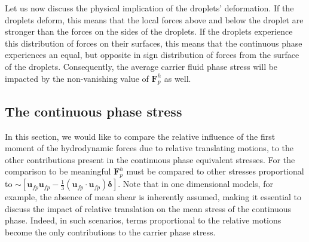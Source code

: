 Let us now discuss the physical implication of the droplets' deformation. 
If the droplets deform, this means that the local forces above and below the droplet are stronger than the forces on the sides of the droplets. 
If the droplets experience this distribution of forces on their surfaces, this means that the continuous phase experiences an equal, but opposite in sign distribution of forces from the surface of the droplets. 
Consequently, the average carrier fluid phase stress will be impacted by the non-vanishing value of $\textbf{F}^h_p$ as well. 

\subsection{The continuous phase stress}

In this section, we would like to compare the relative influence of the first moment of the hydrodynamic forces due to relative translating motions, to the other contributions present in the continuous phase equivalent stresses. 
For the comparison to be meaningful $\textbf{F}^h_p$ must be compared to other stresses proportional to $\sim [\textbf{u}_{fp}\textbf{u}_{fp}-\frac{1}{3}(\textbf{u}_{fp}\cdot\textbf{u}_{fp})\bm\delta]$. 
Note that in one dimensional models, for example, the absence of mean shear is inherently assumed, making it essential to discuss the impact of relative translation on the mean stress of the continuous phase. 
Indeed, in such scenarios, terms proportional to the relative motions become the only contributions to the carrier phase stress. 

